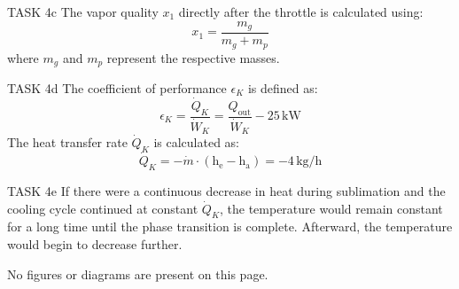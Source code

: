 TASK 4c  
The vapor quality \( x_1 \) directly after the throttle is calculated using:  
\[
x_1 = \frac{m_g}{m_g + m_p}
\]  
where \( m_g \) and \( m_p \) represent the respective masses.  

TASK 4d  
The coefficient of performance \( \epsilon_K \) is defined as:  
\[
\epsilon_K = \frac{\dot{Q}_K}{\dot{W}_K} = \frac{Q_{\text{out}}}{\dot{W}_K} - 25 \, \text{kW}
\]  
The heat transfer rate \( \dot{Q}_K \) is calculated as:  
\[
\dot{Q}_K = -\dot{m} \cdot (\text{h}_{\text{e}} - \text{h}_{\text{a}}) = -4 \, \text{kg/h}
\]  

TASK 4e  
If there were a continuous decrease in heat during sublimation and the cooling cycle continued at constant \( \dot{Q}_K \), the temperature would remain constant for a long time until the phase transition is complete. Afterward, the temperature would begin to decrease further.  

No figures or diagrams are present on this page.